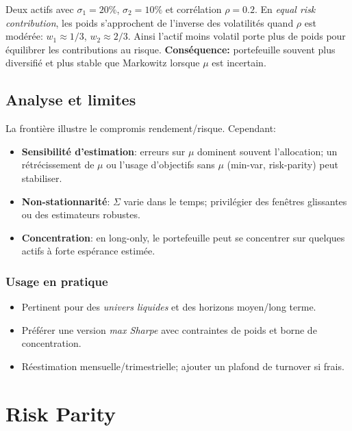 \documentclass[11pt,a4paper]{article}
\begin{document}
\begin{tcolorbox}[title=Exemple chiffré — Parité de risque à 2 actifs]
Deux actifs avec \(\sigma_1=20\%\), \(\sigma_2=10\%\) et corrélation \(\rho=0.2\). En \emph{equal risk contribution}, les poids s'approchent de l'inverse des volatilités quand \(\rho\) est modérée: \(w_1\approx 1/3\), \(w_2\approx 2/3\). Ainsi l'actif moins volatil porte plus de poids pour équilibrer les contributions au risque. \textbf{Conséquence:} portefeuille souvent plus diversifié et plus stable que Markowitz lorsque \(\mu\) est incertain.
\end{tcolorbox}

\subsection{Analyse et limites}
La frontière illustre le compromis rendement/risque. Cependant:
\begin{itemize}
  \item \textbf{Sensibilité d'estimation}: erreurs sur \(\mu\) dominent souvent l'allocation; un rétrécissement de \(\mu\) ou l'usage d'objectifs sans \(\mu\) (min-var, risk-parity) peut stabiliser.
  \item \textbf{Non-stationnarité}: \(\Sigma\) varie dans le temps; privilégier des fenêtres glissantes ou des estimateurs robustes.
  \item \textbf{Concentration}: en long-only, le portefeuille peut se concentrer sur quelques actifs à forte espérance estimée.
\end{itemize}

\subsubsection*{Usage en pratique}
\begin{itemize}
  \item Pertinent pour des \emph{univers liquides} et des horizons moyen/long terme.
  \item Préférer une version \emph{max Sharpe} avec contraintes de poids et borne de concentration.
  \item Réestimation mensuelle/trimestrielle; ajouter un plafond de turnover si frais.
\end{itemize}


\FloatBarrier
\section{Risk Parity}
\end{document}
